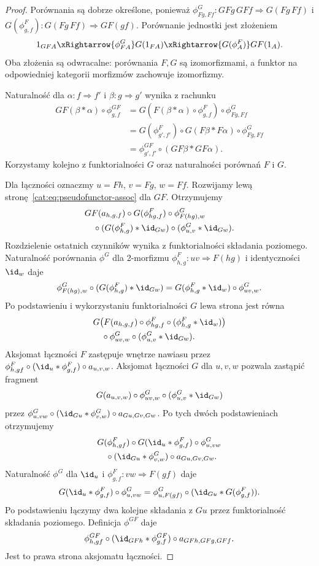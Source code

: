 \begin{proof}
Porównania są dobrze określone, ponieważ
$\phi^G_{Fg,Ff}:GFg\,GFf\Rightarrow G(Fg\,Ff)$ i
$G(\phi^F_{g,f}):G(Fg\,Ff)\Rightarrow GF(gf)$. Porównanie jednostki jest złożeniem
\[
 1_{GFA}\xRightarrow{\phi^G_{FA}}G(1_{FA})
 \xRightarrow{G(\phi^F_A)}GF(1_A).
\]
Oba złożenia są odwracalne: porównania $F,G$ są izomorfizmami, a funktor na odpowiedniej kategorii morfizmów zachowuje izomorfizmy.

Naturalność dla $\alpha:f\Rightarrow f'$ i $\beta:g\Rightarrow g'$ wynika z rachunku
\[
\begin{aligned}
 GF(\beta\ast\alpha)\circ\phi^{GF}_{g,f}
 &=G(F(\beta\ast\alpha)\circ\phi^F_{g,f})\circ\phi^G_{Fg,Ff}\\
 &=G(\phi^F_{g',f'})\circ G(F\beta\ast F\alpha)
       \circ\phi^G_{Fg,Ff}\\
 &=\phi^{GF}_{g',f'}\circ(GF\beta\ast GF\alpha).
\end{aligned}
\]
Korzystamy kolejno z funktorialności $G$ oraz naturalności porównań $F$ i $G$.

Dla łączności oznaczmy $u=Fh$, $v=Fg$, $w=Ff$. Rozwijamy lewą stronę~\eqref{cat:eq:pseudofunctor-assoc} dla $GF$. Otrzymujemy
\[
\begin{aligned}
 &GF(a_{h,g,f})\circ G(\phi^F_{hg,f})
 \circ\phi^G_{F(hg),w}\\
 &\quad\circ(G(\phi^F_{h,g})\ast\id_{Gw})
 \circ(\phi^G_{u,v}\ast\id_{Gw}).
\end{aligned}
\]
Rozdzielenie ostatnich czynników wynika z funktorialności składania poziomego. Naturalność porównania $\phi^G$ dla 2-morfizmu $\phi^F_{h,g}:uv\Rightarrow F(hg)$ i identyczności $\id_w$ daje
\[
 \phi^G_{F(hg),w}\circ(G(\phi^F_{h,g})\ast\id_{Gw})
 =G(\phi^F_{h,g}\ast\id_w)\circ\phi^G_{uv,w}.
\]
Po podstawieniu i wykorzystaniu funktorialności $G$ lewa strona jest równa
\[
\begin{aligned}
 &G\bigl(F(a_{h,g,f})\circ\phi^F_{hg,f}
      \circ(\phi^F_{h,g}\ast\id_w)\bigr)\\
 &\quad\circ\phi^G_{uv,w}\circ(\phi^G_{u,v}\ast\id_{Gw}).
\end{aligned}
\]
Aksjomat łączności $F$ zastępuje wnętrze nawiasu przez
$\phi^F_{h,gf}\circ(\id_u\ast\phi^F_{g,f})\circ a_{u,v,w}$.
Aksjomat łączności $G$ dla $u,v,w$ pozwala zastąpić fragment
\[
 G(a_{u,v,w})\circ\phi^G_{uv,w}
       \circ(\phi^G_{u,v}\ast\id_{Gw})
\]
przez
$\phi^G_{u,vw}\circ(\id_{Gu}\ast\phi^G_{v,w})\circ a_{Gu,Gv,Gw}$.
Po tych dwóch podstawieniach otrzymujemy
\[
\begin{aligned}
 &G(\phi^F_{h,gf})\circ G(\id_u\ast\phi^F_{g,f})
 \circ\phi^G_{u,vw}\\
 &\quad\circ(\id_{Gu}\ast\phi^G_{v,w})
 \circ a_{Gu,Gv,Gw}.
\end{aligned}
\]
Naturalność $\phi^G$ dla $\id_u$ i $\phi^F_{g,f}:vw\Rightarrow F(gf)$ daje
\[
 G(\id_u\ast\phi^F_{g,f})\circ\phi^G_{u,vw}
 =\phi^G_{u,F(gf)}\circ(\id_{Gu}\ast G(\phi^F_{g,f})).
\]
Po podstawieniu łączymy dwa kolejne składania z $Gu$ przez funktorialność składania poziomego. Definicja $\phi^{GF}$ daje
\[
 \phi^{GF}_{h,gf}\circ(\id_{GFh}\ast\phi^{GF}_{g,f})
 \circ a_{GFh,GFg,GFf}.
\]
Jest to prawa strona aksjomatu łączności.


\end{proof}

